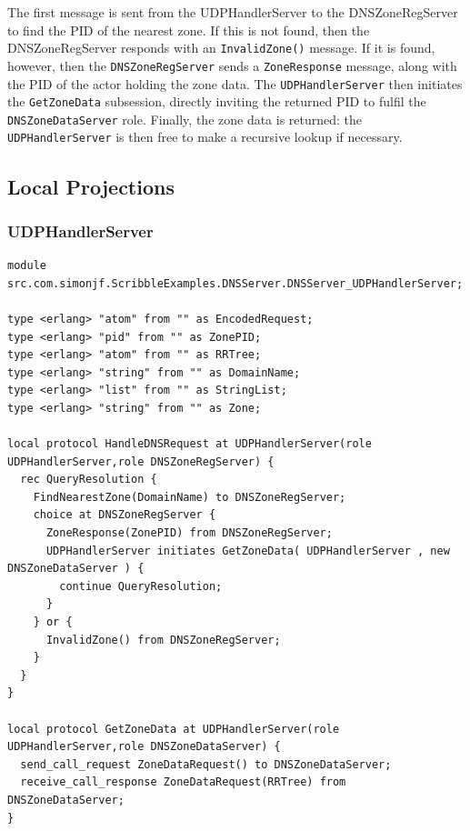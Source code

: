 \documentclass[a4paper]{article}
\begin{document}
The first message is sent from the UDPHandlerServer to the DNSZoneRegServer to find the PID of the nearest zone. If this is not found, then the DNSZoneRegServer responds with an \texttt{InvalidZone()} message. If it is found, however, then the \texttt{DNSZoneRegServer} sends a \texttt{ZoneResponse} message, along with the PID of the actor holding the zone data. The \texttt{UDPHandlerServer} then initiates the \texttt{GetZoneData} subsession, directly inviting the returned PID to fulfil the \texttt{DNSZoneDataServer} role. Finally, the zone data is returned: the \texttt{UDPHandlerServer} is then free to make a recursive lookup if necessary.

\subsection{Local Projections}
\subsubsection{UDPHandlerServer}
\begin{minipage}{\textwidth}
\begin{lstlisting}[language=scribble]
module src.com.simonjf.ScribbleExamples.DNSServer.DNSServer_UDPHandlerServer;

type <erlang> "atom" from "" as EncodedRequest;
type <erlang> "pid" from "" as ZonePID;
type <erlang> "atom" from "" as RRTree;
type <erlang> "string" from "" as DomainName;
type <erlang> "list" from "" as StringList;
type <erlang> "string" from "" as Zone;

local protocol HandleDNSRequest at UDPHandlerServer(role UDPHandlerServer,role DNSZoneRegServer) {
  rec QueryResolution {
    FindNearestZone(DomainName) to DNSZoneRegServer;
    choice at DNSZoneRegServer {
      ZoneResponse(ZonePID) from DNSZoneRegServer;
      UDPHandlerServer initiates GetZoneData( UDPHandlerServer , new DNSZoneDataServer ) {
        continue QueryResolution;
      }
    } or {
      InvalidZone() from DNSZoneRegServer;
    }
  }
}

local protocol GetZoneData at UDPHandlerServer(role UDPHandlerServer,role DNSZoneDataServer) {
  send_call_request ZoneDataRequest() to DNSZoneDataServer;
  receive_call_response ZoneDataRequest(RRTree) from DNSZoneDataServer;
}
\end{lstlisting}
\end{minipage}
\end{document}
